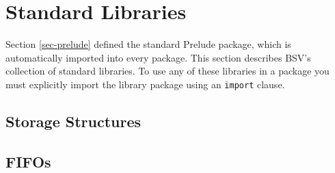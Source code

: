 \documentclass{article}
\newcommand{\BSV}{BSV}
\begin{document}
\clearpage

\section{Standard Libraries}
\label{sec-additional-libs}

Section {\ref{sec-prelude}} defined the standard Prelude package,
which is automatically imported into every package.  This section
describes {\BSV}'s collection of standard libraries.
To use any of these libraries in a package you must
explicitly import the library package using an \texttt{import}
clause.


\subsection{Storage Structures}













\subsection{FIFOs}


















\end{document}
